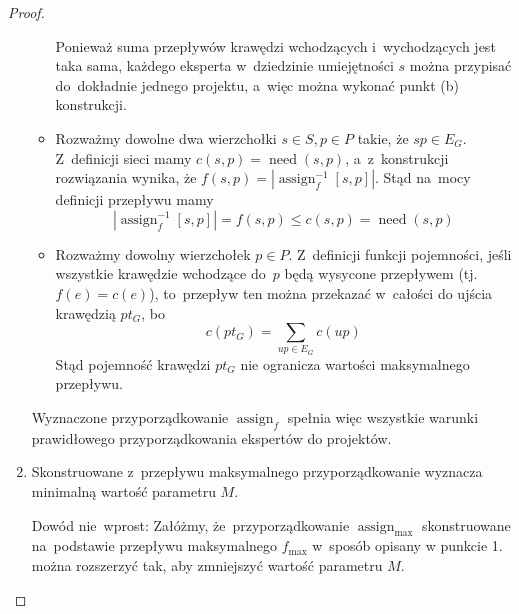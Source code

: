 \documentclass[12pt,a4paper]{article}
\theoremstyle{definition}
\DeclareMathOperator{\need}{need}
\DeclareMathOperator{\assign}{assign}
\begin{document}
\begin{proof}
\begin{enumerate}
\begin{itemize}
		Ponieważ suma przepływów krawędzi wchodzących i~wychodzących jest
		taka sama, każdego eksperta w~dziedzinie umiejętności $s$
		można przypisać do~dokładnie jednego projektu, a~więc można wykonać
		punkt (b) konstrukcji.
		\item Rozważmy dowolne dwa wierzchołki $s \in S, p \in P$ takie, że
		$sp \in E_G$. Z~definicji sieci mamy $c(s,p) = \need(s,p)$,
		a~z~konstrukcji rozwiązania wynika, że
		$f(s,p) = \left|\assign_f^{-1}[s,p]\right|$. Stąd na~mocy definicji
		przepływu mamy
		$$ \left|\assign_f^{-1}[s,p]\right| = f(s,p) \leq c(s,p) = \need(s,p)$$
		\item Rozważmy dowolny wierzchołek $p \in P$. Z~definicji funkcji
		pojemności, jeśli wszystkie krawędzie wchodzące do~$p$ będą wysycone
		przepływem (tj. $f(e) = c(e)$), to~przepływ ten można przekazać
		w~całości do ujścia krawędzią $pt_G$, bo
		$$ c(pt_G) = \sum_{up \in E_G} c(up) $$
		Stąd pojemność krawędzi $pt_G$ nie ogranicza wartości maksymalnego
		przepływu.
	\end{itemize}
	Wyznaczone przyporządkowanie $\assign_f$ spełnia więc wszystkie warunki
	prawidłowego przyporządkowania ekspertów do projektów.

	\item Skonstruowane z~przepływu maksymalnego przyporządkowanie wyznacza
	minimalną wartość parametru $M$.

	Dowód nie~wprost: Załóżmy, że~przyporządkowanie $\assign_{\max}$
	skonstruowane na~podstawie przepływu maksymalnego $f_{\max}$ w~sposób
	opisany w punkcie 1. można rozszerzyć tak, aby zmniejszyć wartość parametru
	$M$.


\end{enumerate}
\end{proof}
\end{document}
